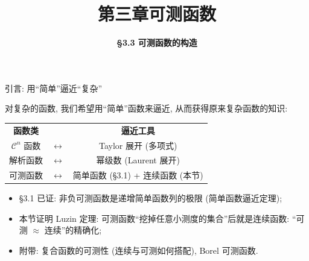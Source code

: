 \everymath{\displaystyle}



\title[第三章\\
可测函数]{\texorpdfstring{\LARGE \bfseries 第三章\quad 可测函数}{第三章 可测函数}}
\author[\S 3.3\\
可测函数的构造]
{\Large \bfseries \S 3.3 可测函数的构造}
\date{}





\begin{frame}

\titlepage

\end{frame}




\begin{frame}{引言: 用``简单''逼近``复杂''}

对复杂的函数, 我们希望用``简单''函数来\alert{逼近}, 从而获得原来复杂函数的知识:

\begin{center}
\begin{tabular}{ccc}
\textbf{函数类} & \quad & \textbf{逼近工具} \\
$\mathcal{C}^n$ 函数 & $\longleftrightarrow$ & Taylor 展开 (多项式) \\
解析函数 & $\longleftrightarrow$ & 幂级数 (Laurent 展开) \\
\alert{可测函数} & $\longleftrightarrow$ & \alert{简单函数 (\S 3.1) + 连续函数 (本节)} \\
\end{tabular}
\end{center}

\pause

\begin{itemize}
\item \S 3.1 已证: 非负可测函数是\alert{递增简单函数列}的极限 (简单函数逼近定理);
\item 本节证明 \alert{Luzin 定理}: 可测函数``挖掉任意小测度的集合''后就是\alert{连续函数}:
  ``可测 $\approx$ 连续''的精确化;
\item 附带: 复合函数的可测性 (连续与可测如何搭配), Borel 可测函数.
\end{itemize}

\end{frame}

